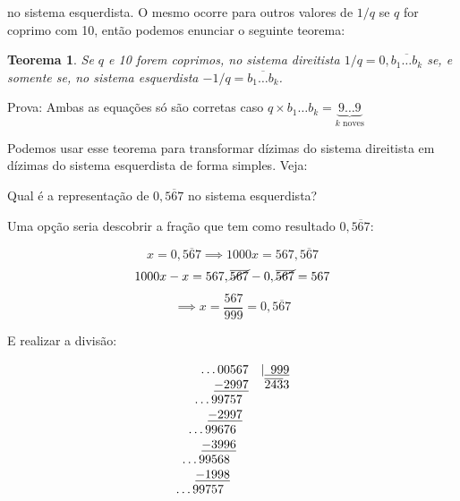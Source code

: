 \documentclass{report}
\newtheorem{theorem}{Teorema}
\theoremstyle{definition}
\begin{document}
no sistema esquerdista. O mesmo ocorre para outros valores de $1/q$ se $q$ for coprimo com 10, então podemos enunciar o seguinte teorema:

\begin{theorem}
    Se $q$ e 10 forem coprimos, no sistema direitista $1/q = 0,\overline{b_1 \ldots b_k}$ se, e somente se, no sistema esquerdista $-1/q = \overline{b_1 \ldots b_k}$.
\end{theorem}

Prova: Ambas as equações só são corretas caso $q \times b_1 \ldots b_k = \underbrace{9 \ldots 9}_{k\text{ noves}}$

Podemos usar esse teorema para transformar dízimas do sistema direitista em dízimas do sistema esquerdista de forma simples. Veja:

\bigskip

Qual é a representação de $0,\overline{567}$ no sistema esquerdista?

\bigskip

Uma opção seria descobrir a fração que tem como resultado $0,\overline{567}$:

\begin{equation*}
    x = 0,\overline{567} \implies 1000x = 567,\overline{567}
\end{equation*}
\begin{equation*}
    1000x - x = 567,\cancel{\overline{567}} - 0,\cancel{\overline{567}} = 567
\end{equation*}
\begin{equation*}
    \implies x = \frac{567}{999} = 0,\overline{567} 
\end{equation*}

E realizar a divisão:

\[
    \begin{array}{rr}
        \ldots 00567& |\underline{\hphantom{0}999}\\
        \underline{-2997}&           \overline{243}3\\
        \ldots 99757\hphantom{1}&           \\
        \underline{-2997}\hphantom{1}&      \\
        \ldots 99676\hphantom{22}&          \\
        \underline{-3996}\hphantom{22}&     \\
        \ldots 99568\hphantom{333}&         \\
        \underline{-1998}\hphantom{333}&    \\
        \ldots 99757\hphantom{4444}&
    \end{array}
\]
\end{document}
